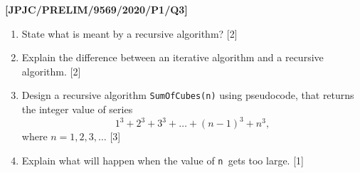 \item \textbf{{[}JPJC/PRELIM/9569/2020/P1/Q3{]} }
\begin{enumerate}
\item State what is meant by a recursive algorithm? \hfill{}{[}2{]}
\item Explain the difference between an iterative algorithm and a recursive
algorithm. \hfill{}{[}2{]}
\item Design a recursive algorithm \texttt{SumOfCubes(n)} using pseudocode,
that returns the integer value of series 
\[
1^{3}+2^{3}+3^{3}+\ldots+(n-1)^{3}+n^{3},
\]
where $n=1,2,3,\ldots$ \hfill{}{[}3{]}
\item Explain what will happen when the value of \texttt{n }gets too large.
\hfill{}{[}1{]}
\end{enumerate}